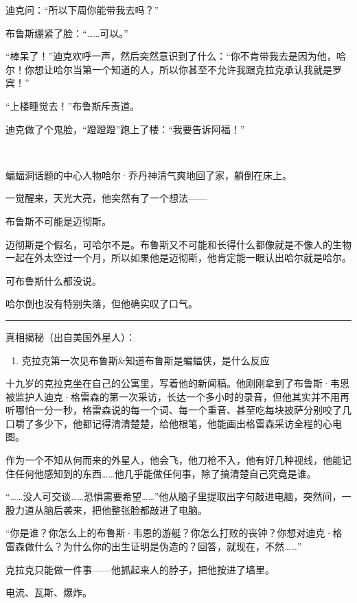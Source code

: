 \documentclass[../main]{subfiles}
\begin{document}
迪克问：“所以下周你能带我去吗？”

布鲁斯绷紧了脸：“……可以。”

“棒呆了！”迪克欢呼一声，然后突然意识到了什么：“你不肯带我去是因为他，哈尔！你想让哈尔当第一个知道的人，所以你甚至不允许我跟克拉克承认我就是罗宾！”

“上楼睡觉去！”布鲁斯斥责道。

迪克做了个鬼脸，“蹬蹬蹬”跑上了楼：“我要告诉阿福！”

~\

蝙蝠洞话题的中心人物哈尔·乔丹神清气爽地回了家，躺倒在床上。

一觉醒来，天光大亮，他突然有了一个想法——

布鲁斯不可能是迈彻斯。

迈彻斯是个假名，可哈尔不是。布鲁斯又不可能和长得什么都像就是不像人的生物一起在外太空过一个月，所以如果他是迈彻斯，他肯定能一眼认出哈尔就是哈尔。

可布鲁斯什么都没说。

哈尔倒也没有特别失落，但他确实叹了口气。

\begin{center}\rule{0.5\linewidth}{0.5pt}\end{center}

真相揭秘（出自美国外星人）：

\begin{enumerate}
    \def\labelenumi{\arabic{enumi}.}
    \item
          克拉克第一次见布鲁斯\&知道布鲁斯是蝙蝠侠，是什么反应
\end{enumerate}

十九岁的克拉克坐在自己的公寓里，写着他的新闻稿。他刚刚拿到了布鲁斯·韦恩被监护人迪克·格雷森的第一次采访，长达一个多小时的录音，但他其实并不用再听哪怕一分一秒，格雷森说的每一个词、每一个重音、甚至吃每块披萨分别咬了几口嚼了多少下，他都记得清清楚楚，给他根笔，他能画出格雷森采访全程的心电图。

作为一个不知从何而来的外星人，他会飞，他刀枪不入，他有好几种视线，他能记住任何他感知到的东西……他几乎能做任何事，除了搞清楚自己究竟是谁。

“……没人可交谈……恐惧需要希望……”他从脑子里提取出字句敲进电脑，突然间，一股力道从脑后袭来，把他整张脸都敲进了电脑。

“你是谁？你怎么上的布鲁斯·韦恩的游艇？你怎么打败的丧钟？你想对迪克·格雷森做什么？为什么你的出生证明是伪造的？回答，就现在，不然……”

克拉克只能做一件事——他抓起来人的脖子，把他按进了墙里。

电流、瓦斯、爆炸。
\end{document}
